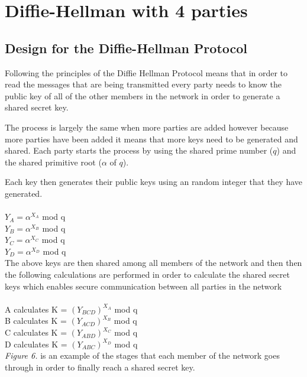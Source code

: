 \documentclass[a4paper, twoside, 11pt]{article}
\begin{document}
\section{Diffie-Hellman with 4 parties}
\subsection{Design for the Diffie-Hellman Protocol}
Following the principles of the Diffie Hellman Protocol means that in order
to read the messages that are being transmitted every party needs to know the
public key of all of the other members in the network in order to generate a shared secret key.

The process is largely the same when more parties are added however because more parties have been added it means that more keys need to be generated and shared. Each party starts the process by using the shared prime number ($q$) and the shared primitive root ($\alpha$ of $q$).

Each key then generates their public keys using an random integer that they have generated. \\
\\
$Y_A = \alpha^{X_A}$ mod q \\
$Y_B = \alpha^{X_B}$ mod q \\
$Y_C = \alpha^{X_C}$ mod q \\
$Y_D = \alpha^{X_D}$ mod q \\

The above keys are then shared among all members of the network and then
then the following calculations are performed in order to calculate the shared secret keys which enables secure communication between all parties in the network\\
\\
A calculates K = $(Y_{BCD})^{X_A}$ mod q \\
B calculates K = $(Y_{ACD})^{X_B}$ mod q \\
C calculates K = $(Y_{ABD})^{X_C}$ mod q \\
D calculates K = $(Y_{ABC})^{X_D}$ mod q \\


\textit{Figure 6.} is an example of the stages that each member of the network goes through in order to finally reach a shared secret key. 
\end{document}
